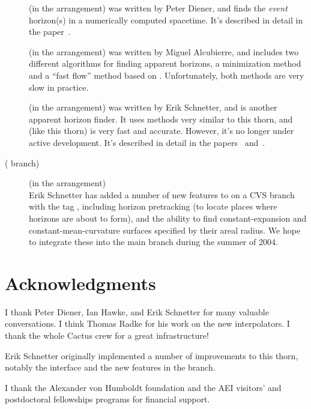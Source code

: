 \begin{description}
\item[] (in the  arrangement)
	was written by Peter Diener, and finds the {\em event\/} horizon(s)
	in a numerically computed spacetime.  It's described in detail in
	the paper~\cite{AHFinderDirect/Diener03a}.
\item[] (in the  arrangement)
	was written by Miguel Alcubierre, and includes two different
	algorithms for finding apparent horizons, a minimization method
	and a ``fast flow'' method based on \cite{AHFinderDirect/Gundlach97a}.
	Unfortunately, both methods are very slow in practice.
\item[] (in the  arrangement)
	was written by Erik Schnetter, and is another apparent horizon
	finder.  It uses methods very similar to this thorn, and (like
	this thorn) is very fast and accurate.  However, it's no longer
	under active development.  It's described in detail in the
	papers~\cite{AHFinderDirect/Schnetter02a}
	and~\cite{AHFinderDirect/Schnetter03a}.
\item[ ( branch)]
      (in the  arrangement)\\
	Erik Schnetter has added a number of new features to
	 on a CVS branch with the tag ,
	including horizon pretracking (to locate places where horizons
	are about to form), and the ability to find constant-expansion
	and constant-mean-curvature surfaces specified by their areal radius.
	We hope to integrate these into the main 
	branch during the summer of 2004.
\end{description}


\section{Acknowledgments}

I thank Peter Diener, Ian Hawke, and Erik Schnetter for many valuable
conversations.  I think Thomas Radke for his work on the new interpolators.
I thank the whole Cactus crew for a great infrastructure!

Erik Schnetter originally implemented a number of improvements to
this thorn, notably the  interface and the
new features in the  branch.

I thank the Alexander von Humboldt foundation and the AEI visitors'
and postdoctoral fellowships programs for financial support.







